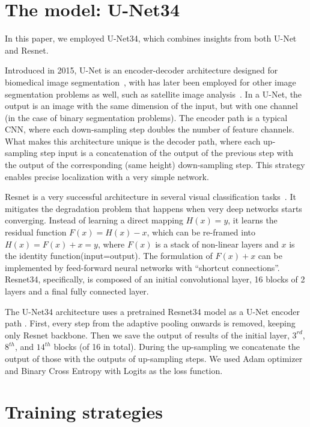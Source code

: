 \documentclass{article}
\begin{document}
\section{The model: U-Net34}
In this paper, we employed U-Net34, which combines insights from both
U-Net and Resnet.

Introduced in 2015, U-Net is an encoder-decoder architecture designed for biomedical image segmentation~\cite{ronneberger_etal_UNet_miccai2015},
with has later been employed for other image segmentation problems
as well, such as satellite image analysis~\cite{iglovikov}.
In a U-Net, the output is an image with the same dimension of the input,
but with one channel (in the case of binary segmentation problems).
The encoder path is a typical CNN, where each down-sampling step doubles
the number of feature channels.
What makes this architecture unique is the decoder path, where each
up-sampling step input is a concatenation of the output of the previous
step with the output of the corresponding (same height) down-sampling step.
This strategy enables precise localization with a very simple network. 

Resnet is a very successful architecture in several visual classification
tasks~\cite{he}.
It mitigates the degradation problem that happens when very deep
networks starts converging.
Instead of learning a direct mapping $H(x) = y$, it learns the residual
function  $F(x) = H(x)-x$, which can be re-framed into
$H(x) = F(x)+x = y$, where $F(x)$ is a stack of non-linear layers and
$x$ is the identity function(input=output).
The formulation of $F(x)+x$ can be implemented by feed-forward neural
networks with ``shortcut connections''.
Resnet34, specifically, is composed of an initial convolutional layer,
16 blocks of 2 layers and a final fully connected layer.

The U-Net34 architecture uses a pretrained Resnet34 model as a
U-Net encoder path \cite{fastai}. First, every step from the adaptive
pooling onwards is removed, keeping only Resnet backbone.
Then we save the output of results of the initial layer, $3^{rd}$, $8^{th}$,
and $14^{th}$ blocks (of 16 in total).
During the up-sampling we concatenate the output of those with
the outputs of up-sampling steps.
We used Adam optimizer and Binary Cross Entropy with Logits as the loss function.


\section{Training strategies}
\label{sec:seg_training}
\end{document}
